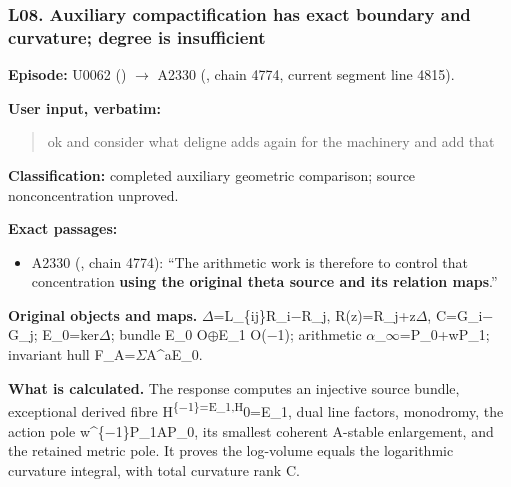 \subsubsection{L08. Auxiliary compactification has exact boundary and
curvature; degree is
insufficient}\label{l08.-auxiliary-compactification-has-exact-boundary-and-curvature-degree-is-insufficient}

\textbf{Episode:} U0062
(\protect{})
\allowbreak{}\ensuremath{→}\allowbreak{} A2330
(\protect{}, chain 4774,
current segment line 4815).

\textbf{User input, verbatim:}

\begin{quote}
ok and consider what deligne adds again for the machinery and add that
\end{quote}

\textbf{Classification:} completed auxiliary geometric comparison;
source nonconcentration unproved.

\textbf{Exact passages:}

\begin{itemize}
\tightlist
\item
  A2330 (\protect{}, chain
  4774): ``The arithmetic work is therefore to control that
  concentration \textbf{using the original theta source and its relation
  maps}.''
\end{itemize}

\textbf{Original objects and maps.}
\allowbreak{}\ensuremath{Δ}\allowbreak{}=L\_\{ij\}R\_i\allowbreak{}\ensuremath{−}\allowbreak{}R\_j,
R(z)=R\_j+z\allowbreak{}\ensuremath{Δ}\allowbreak{},
C=G\_i\allowbreak{}\ensuremath{−}\allowbreak{}G\_j;
E\_0=ker\allowbreak{}\ensuremath{Δ}\allowbreak{}; bundle E\_0
O\allowbreak{}\ensuremath{⊕}\allowbreak{}E\_1
O(\allowbreak{}\ensuremath{−}\allowbreak{}1); arithmetic
\allowbreak{}\ensuremath{α}\allowbreak{}\_\allowbreak{}\ensuremath{∞}\allowbreak{}=P\_0+wP\_1;
invariant hull
F\_A=\allowbreak{}\ensuremath{Σ}\allowbreak{}A\textasciicircum{}aE\_0.

\textbf{What is calculated.} The response computes an injective source
bundle, exceptional derived fibre
H\textsuperscript{\{\allowbreak{}\ensuremath{−}\allowbreak{}1\}=E\_1,H}0=E\_1,
dual line factors, monodromy, the action pole
w\textasciicircum{}\{\allowbreak{}\ensuremath{−}\allowbreak{}1\}P\_1AP\_0,
its smallest coherent A-stable enlargement, and the retained metric
pole. It proves the log-volume equals the logarithmic curvature
integral, with total curvature rank C.

